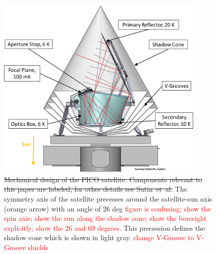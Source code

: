 \documentclass[]{spie}  %
\newcommand{\comr}[1]{\textcolor{red}{#1}}
\newcommand{\comb}[1]{\textcolor{blue}{#1}}
\begin{document}
\begin{figure} [ht]
\begin{center}
\includegraphics[height=9cm]{PICO_CAD_annotated.png}
\end{center}
\caption { \label{fig:cad} 
\sout{Mechanical design of the PICO satellite. Components relevant to this paper are labeled, for other details see Sutin~et~al.\cite{brian_spie}}
The symmetry axis of the satellite precesses around the satellite-sun axis (orange arrow) with an angle of 26 deg \comr{figure is confusing; show the spin 
axis; show the sun along the shadow cone; show the boresight explicitly; show the 26 and 69 degrees}. This precession defines the 
shadow cone which is shown in light gray. \comr{change V-Groove to V-Groove shields}
}
\end{figure} 

\end{document}
